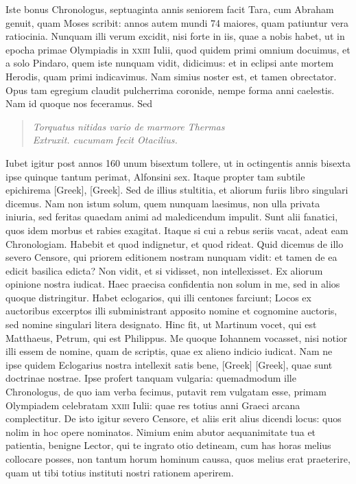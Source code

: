 Iste bonus
Chronologus, septuaginta annis seniorem facit Tara, cum Abraham
genuit, quam Moses scribit: annos autem mundi 74 maiores,
quam patiuntur vera ratiocinia.
Nunquam illi verum excidit, nisi
forte in iis, quae a nobis habet, ut in epocha primae Olympiadis in
\textsc{xxiii} Iulii, quod quidem primi omnium docuimus, et a solo
Pindaro, quem iste nunquam vidit, didicimus: et in eclipsi ante
mortem Herodis, quam primi indicavimus.
Nam simius noster est,
et tamen obrectator.
Opus tam egregium claudit pulcherrima
coronide, nempe forma anni caelestis.
Nam id quoque nos feceramus.
Sed
\begin{quote}
\textit{Torquatus nitidas vario de marmore Thermas}\\
	\textit{Extruxit. cucumam fecit Otacilius.}
\end{quote}
Iubet igitur post annos 160 unum bisextum tollere, ut in octingentis
annis bisexta ipse quinque tantum perimat, Alfonsini sex.
Itaque propter tam subtile epichirema \textgreek{[Greek]},
 \textgreek{[Greek]}.
Sed de illius stultitia, et aliorum furiis libro singulari dicemus.
Nam non istum solum, quem nunquam laesimus, non ulla privata iniuria,
sed feritas quaedam animi ad maledicendum impulit.
Sunt alii
fanatici, quos idem morbus et rabies exagitat.
Itaque si cui a rebus
seriis vacat, adeat eam Chronologiam.
Habebit et quod indignetur,
et quod rideat.
Quid dicemus de illo severo Censore, qui priorem
editionem nostram nunquam vidit: et tamen de ea edicit basilica
edicta?
Non vidit, et si vidisset, non intellexisset.
Ex aliorum opinione
nostra iudicat.
Haec praecisa confidentia non solum in me,
sed in alios quoque distringitur.
Habet eclogarios, qui illi centones
farciunt;
Locos ex auctoribus excerptos illi subministrant apposito
nomine et cognomine auctoris, sed nomine singulari litera designato.
Hinc fit, ut Martinum vocet, qui est Matthaeus, Petrum, qui est
Philippus.
Me quoque Iohannem vocasset, nisi notior illi essem de
nomine, quam de scriptis, quae ex alieno indicio iudicat.
Nam
ne ipse quidem Eclogarius nostra intellexit satis bene, \textgreek{[Greek]}
\textgreek{[Greek]}, quae sunt doctrinae nostrae.
Ipse profert tanquam vulgaria: quemadmodum ille Chronologus, de quo iam
verba fecimus, putavit rem vulgatam esse, primam Olympiadem
celebratam \textsc{xxiii} Iulii:
 quae res totius anni Graeci arcana complectitur.
De isto igitur severo Censore, et aliis erit alius dicendi locus:
quos nolim in hoc opere nominatos.
Nimium enim abutor aequanimitate
tua et patientia, benigne Lector, qui te ingrato otio detineam,
cum has horas melius collocare posses, non tantum horum
hominum caussa, quos melius erat praeterire, quam ut tibi totius instituti
nostri rationem aperirem.

